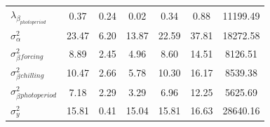 \documentclass{article}\usepackage[]{graphicx}\usepackage[]{color}
\begin{document}
\begin{table}[H]
\begin{center}
\begin{tabular}{@{}lcccccc@{}}
$\lambda_\beta_{photoperiod}$  & 0.37                              & 0.24                            & 0.02                                & 0.34                              & 0.88                                 & 11199.49                            \\
$\sigma_\alpha^2$              & 23.47                             & 6.20                            & 13.87                               & 22.59                             & 37.81                                & 18272.58                            \\
$\sigma_\beta^2_{forcing}$     & 8.89                              & 2.45                            & 4.96                                & 8.60                              & 14.51                                & 8126.51                             \\
$\sigma_\beta^2_{chilling}$    & 10.47                             & 2.66                            & 5.78                                & 10.30                             & 16.17                                & 8539.38                             \\
$\sigma_\beta^2_{photoperiod}$ & 7.18                              & 2.29                            & 3.29                                & 6.96                              & 12.25                                & 5625.69                             \\
$\sigma_y^2$                   & 15.81                             & 0.41                            & 15.04                               & 15.81                             & 16.63                                & 28640.16                            \\ \bottomrule
\end{tabular}
\end{center}
\label{tab:modelgymlamb}
\end{table}
\end{document}
